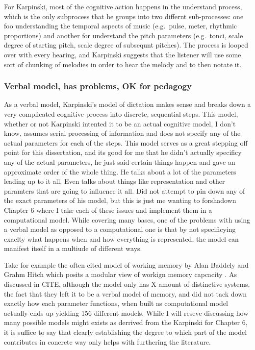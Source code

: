 \documentclass[]{book}
\theoremstyle{definition}
\theoremstyle{definition}
\theoremstyle{definition}
\theoremstyle{remark}
\begin{document}
For Karpinski, most of the cognitive action happens in the understand
process, which is the only subprocess that he groups into two differnt
sub-processes: one foo understanding the temporal aspects of music
(e.g.~pulse, meter, rhythmic proportions) and another for understand the
pitch parameters (e.g.~tonci, scale degree of starting pitch, scale
degree of subsequnt pitches). The process is looped over with every
hearing, and Karpinski suggests that the listener will use some sort of
chunking of melodies in order to hear the melody and to then notate it.

\hypertarget{verbal-model-has-problems-ok-for-pedagogy}{%
\subsubsection{Verbal model, has problems, OK for
pedagogy}\label{verbal-model-has-problems-ok-for-pedagogy}}

As a verbal model, Karpinski's model of dictation makes sense and breaks
down a very complicated cognitive process into discrete, sequential
steps. This model, whether or not Karpinski intented it to be an actual
cognitive model, I don't know, assumes serial processing of information
and does not specify any of the actual parameters for each of the steps.
This model serves as a great stepping off point for this dissertation,
and its good for me that he didn't actually specificy any of the actual
parameters, he just said certain things happen and gave an approximate
order of the whole thing. He talks about a lot of the parameters leading
up to it all, Even talks about things like representation and other
paramters that are going to influence it all. Did not attempt to pin
down any of the exact parameters of his model, but this is just me
wanting to forshadown Chapter 6 where I take each of these issues and
implement them in a computational model. While covering many bases, one
of the problems with using a verbal model as opposed to a computational
one is that by not specificying exaclty what happens when and how
everything is represented, the model can manifest itself in a multiude
of different ways.

Take for example the often cited model of working memory by Alan Baddely
and Grahm Hitch which posits a modular view of workign memory capcacity
\citep{baddeleyWorkingMemory1974}. As discussed in CITE, although the
model only has X amount of distinctive systems, the fact that they left
it to be a verbal model of memory, and did not tack down exactly how
each parameter functions, when built as computational model actually
ends up yielding 156 different models. While I will reseve discussing
how many possible models might exists as derrived from the Karpinski for
Chapter 6, it is suffice to say that clearly establishing the degree to
which part of the model contributes in concrete way only helps with
furthering the literature.
\end{document}
